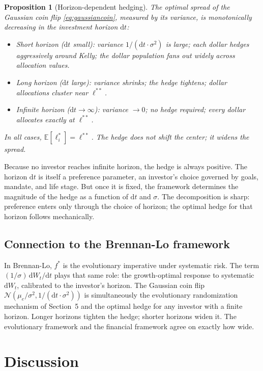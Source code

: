 \documentclass[11pt]{article}
\newtheorem{proposition}{Proposition}
\newcommand{\lopt}{\ell^{*}}
\newcommand{\lkelly}{\ell^{**}}
\newcommand{\mue}{\mu_{e}}
\newcommand{\E}{\mathbb{E}}
\newcommand{\dd}{\mathrm{d}}
\begin{document}
\begin{proposition}[Horizon-dependent hedging]
The optimal spread of the Gaussian coin flip
\eqref{eq:gaussiancoin}, measured by its variance, is monotonically
decreasing in the investment horizon $\dd t$:
\begin{itemize}
  \item Short horizon ($\dd t$ small): variance $1/(\dd t\cdot\sigma^{2})$
    is large; each dollar hedges aggressively around Kelly; the
    dollar population fans out widely across allocation values.
  \item Long horizon ($\dd t$ large): variance shrinks; the hedge
    tightens; dollar allocations cluster near $\lkelly$.
  \item Infinite horizon ($\dd t \to \infty$): variance $\to 0$; no
    hedge required; every dollar allocates exactly at $\lkelly$.
\end{itemize}
In all cases, $\E[\lopt_{i}] = \lkelly$. The hedge does not shift
the center; it widens the spread.
\end{proposition}

Because no investor reaches infinite horizon, the hedge is always
positive. The horizon $\dd t$ is itself a preference parameter, an investor's choice governed by goals, mandate, and life stage. But
once it is fixed, the framework determines the magnitude of the
hedge as a function of $\dd t$ and $\sigma$. The decomposition is
sharp: preference enters only through the choice of horizon; the
optimal hedge for that horizon follows mechanically.

\subsection{Connection to the Brennan-Lo framework}

In Brennan-Lo, $f^{*}$ is the evolutionary imperative under
systematic risk. The term $(1/\sigma)\,\dd W_{t}/\dd t$ plays that
same role: the growth-optimal response to systematic $\dd W_{t}$,
calibrated to the investor's horizon. The Gaussian coin flip
$\mathcal{N}(\mue/\sigma^{2}, 1/(\dd t\cdot\sigma^{2}))$ is
simultaneously the evolutionary randomization mechanism of
Section~5 and the optimal hedge for any investor with a finite
horizon. Longer horizons tighten the hedge; shorter horizons widen
it. The evolutionary framework and the financial framework agree on
exactly how wide.

\section{Discussion}
\end{document}
